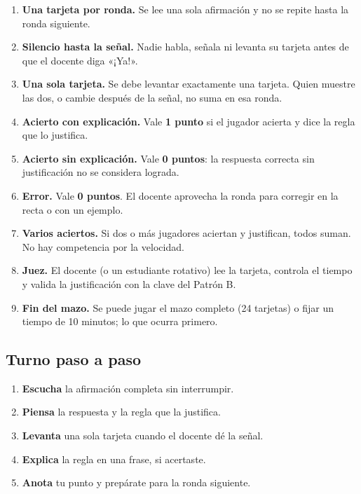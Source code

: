 \documentclass[12pt, letterpaper]{article}
\begin{document}
\begin{enumerate}[leftmargin=*]
  \item \textbf{Una tarjeta por ronda.} Se lee una sola afirmación y no se repite hasta la ronda siguiente.
  \item \textbf{Silencio hasta la señal.} Nadie habla, señala ni levanta su tarjeta antes de que el docente diga «¡Ya!».
  \item \textbf{Una sola tarjeta.} Se debe levantar exactamente una tarjeta. Quien muestre las dos, o cambie después de la señal, no suma en esa ronda.
  \item \textbf{Acierto con explicación.} Vale \textbf{1 punto} si el jugador acierta y dice la regla que lo justifica.
  \item \textbf{Acierto sin explicación.} Vale \textbf{0 puntos}: la respuesta correcta sin justificación no se considera lograda.
  \item \textbf{Error.} Vale \textbf{0 puntos}. El docente aprovecha la ronda para corregir en la recta o con un ejemplo.
  \item \textbf{Varios aciertos.} Si dos o más jugadores aciertan y justifican, todos suman. No hay competencia por la velocidad.
  \item \textbf{Juez.} El docente (o un estudiante rotativo) lee la tarjeta, controla el tiempo y valida la justificación con la clave del Patrón B.
  \item \textbf{Fin del mazo.} Se puede jugar el mazo completo (24 tarjetas) o fijar un tiempo de 10 minutos; lo que ocurra primero.
\end{enumerate}

\subsection{Turno paso a paso}

\begin{enumerate}[leftmargin=*]
  \item \textbf{Escucha} la afirmación completa sin interrumpir.
  \item \textbf{Piensa} la respuesta y la regla que la justifica.
  \item \textbf{Levanta} una sola tarjeta cuando el docente dé la señal.
  \item \textbf{Explica} la regla en una frase, si acertaste.
  \item \textbf{Anota} tu punto y prepárate para la ronda siguiente.
\end{enumerate}
\end{document}
